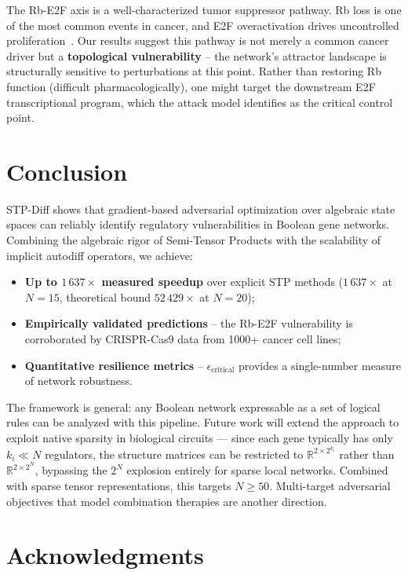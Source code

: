 \documentclass[11pt,a4paper]{article}
\begin{document}
The Rb-E2F axis is a well-characterized tumor suppressor pathway. Rb loss is one of the most common events in cancer, and E2F overactivation drives uncontrolled proliferation~\cite{hanahan2011hallmarks}. Our results suggest this pathway is not merely a common cancer driver but a \textbf{topological vulnerability} -- the network's attractor landscape is structurally sensitive to perturbations at this point. Rather than restoring Rb function (difficult pharmacologically), one might target the downstream E2F transcriptional program, which the attack model identifies as the critical control point.

\section{Conclusion}
\label{sec:conclusion}

STP-Diff shows that gradient-based adversarial optimization over algebraic state spaces can reliably identify regulatory vulnerabilities in Boolean gene networks. Combining the algebraic rigor of Semi-Tensor Products with the scalability of implicit autodiff operators, we achieve:
\begin{itemize}[leftmargin=*]
    \item \textbf{Up to $1\,637\times$ measured speedup} over explicit STP methods ($1\,637\times$ at $N=15$, theoretical bound $52\,429\times$ at $N=20$);
    \item \textbf{Empirically validated predictions} -- the Rb-E2F vulnerability is corroborated by CRISPR-Cas9 data from 1000+ cancer cell lines;
    \item \textbf{Quantitative resilience metrics} -- $\epsilon_{\text{critical}}$ provides a single-number measure of network robustness.
\end{itemize}

The framework is general: any Boolean network expressable as a set of logical rules can be analyzed with this pipeline. Future work will extend the approach to exploit native sparsity in biological circuits — since each gene typically has only $k_i \ll N$ regulators, the structure matrices can be restricted to $\mathbb{R}^{2 \times 2^{k_i}}$ rather than $\mathbb{R}^{2 \times 2^N}$, bypassing the $2^N$ explosion entirely for sparse local networks. Combined with sparse tensor representations, this targets $N \geq 50$. Multi-target adversarial objectives that model combination therapies are another direction.

\section*{Acknowledgments}
\end{document}
